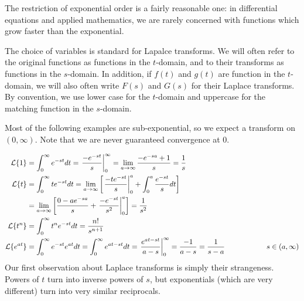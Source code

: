 \documentclass[fleqn,letterpaper]{report}
\begin{document}
The restriction of exponential order is a fairly reasonable
one: in differential equations and applied mathematics, we
are rarely concerned with functions which grow faster
than the exponential. 

The choice of variables is standard for Lapalce transforms.
We will often refer to the original functions as functions in
the $t$-domain, and to their transforms as functions in the
$s$-domain. In addition, if $f(t)$ and $g(t)$ are function in
the $t$-domain, we will also often write $F(s)$ and $G(s)$ for
their Laplace transforms. By convention, we use lower case for
the $t$-domain and uppercase for the matching function in
the $s$-domain.

Most of the following examples are sub-exponential, so we expect
a transform on $(0, \infty)$. Note that we are never guaranteed
convergence at $0$. 

\begin{example}
\begin{align*}
\mathcal{L} \{ 1 \} & = \int_0^\infty e^{-st} dt = \left.
\frac{-e^{-st}}{s} \right|_0^\infty = \lim_{a \rightarrow \infty}
\frac{-e^{-sa} + 1}{s} = \frac{1}{s} \\
\mathcal{L} \{ t \} & = \int_0^\infty te^{-st} dt = \lim_{a
\rightarrow \infty} \left[ \left. \frac{-te^{-st}}{s}
\right|_0^a + \int_0^a \frac{e^{-st}}{s} dt \right] \\
& = \lim_{a \rightarrow \infty} \left[ \frac{0 - ae^{-sa}}{s} +
\left. \frac{-e^{-st}}{s^2} \right|_0^a \right] = \frac{1}{s^2}
\\
\mathcal{L} \{ t^n \} & = \int_0^\infty t^ne^{-st} dt =
\frac{n!}{s^{n+1}} \\
\mathcal{L} \{ e^{at} \} & = \int_0^\infty e^{-st}e^{at} dt =
\int_0^\infty e^{at-st} dt = \left. \frac{e^{at-st}}{a-s}
\right|_0^\infty = \frac{-1}{a-s} = \frac{1}{s-a} \hspace{2cm}
s \in (a, \infty)
\end{align*}
Our first observation about Laplace transforms is simply their
strangeness. Powers of $t$ turn into inverse powers of $s$,
but exponentials (which are very different) turn into very
similar reciprocals.
\end{example}
\end{document}
